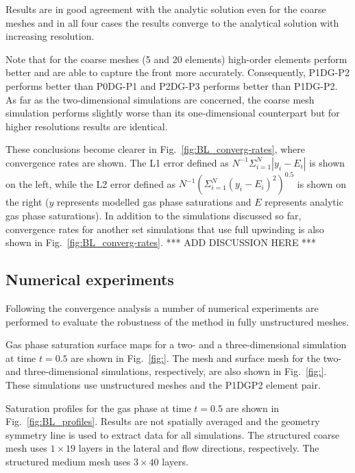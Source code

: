 \documentclass[preprint,authoryear,12pt]{elsarticle}
\begin{document}
{Results are in good agreement with the analytic solution even for the
coarse meshes and in all four cases the results converge to the
analytical solution with increasing resolution.

Note that for the coarse meshes (5 and 20 elements) high-order
elements perform better and are able to capture the front more
accurately. Consequently, P1DG-P2 performs better than P0DG-P1 and
P2DG-P3 performs better than P1DG-P2. As far as the two-dimensional
simulations are concerned, the coarse mesh simulation performs
slightly worse than its one-dimensional counterpart but for higher
resolutions results are identical.

These conclusions become clearer in Fig.~\ref{fig:BL_converg-rates},
where convergence rates are shown. The L1 error defined as $N^{-1}
\Sigma_{i=1}^N|y_i-E_i| $ is shown on the left, while the L2 error
defined as $N^{-1} (\Sigma_{i=1}^N(y_i-E_i)^2)^{0.5}$ is shown on the
right ($y$ represents modelled gas phase saturations and $E$
represents analytic gas phase saturations). In addition to the
simulations discussed so far, convergence rates for another set
simulations that use full upwinding is also shown in
Fig.~\ref{fig:BL_converg-rates}. *** ADD DISCUSSION HERE ***


\subsection{Numerical experiments}
Following the convergence analysis a number of numerical experiments
are performed to evaluate the robustness of the method in fully
unstructured meshes.

Gas phase saturation surface maps for a two- and a three-dimensional
simulation at time $t=0.5$ are shown in Fig.~\ref{fig:}. The mesh and
surface mesh for the two- and three-dimensional simulations,
respectively, are also shown in Fig.~\ref{fig:}. These simulations use
unstructured meshes and the P1DGP2 element pair.

Saturation profiles for the gas phase at time $t=0.5$ are shown in
Fig.~\ref{fig:BL_profiles}. Results are not spatially averaged and the
geometry symmetry line is used to extract data for all simulations.
The structured coarse mesh uses $1 \times 19$ layers in the lateral
and flow directions, respectively. The structured medium mesh uses $3
\times 40$ layers.


}
\end{document}

